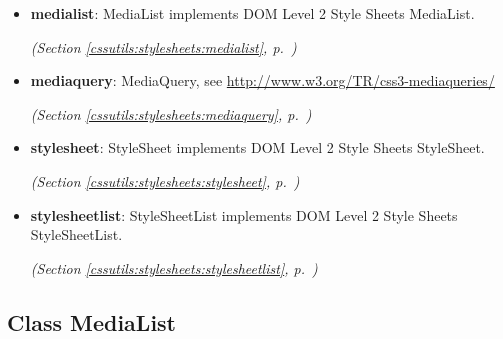 \begin{itemize}
\setlength{\parskip}{0ex}
\item \textbf{medialist}: 
MediaList implements DOM Level 2 Style Sheets MediaList.


  \textit{(Section \ref{cssutils:stylesheets:medialist}, p.~\pageref{cssutils:stylesheets:medialist})}

\item \textbf{mediaquery}: 
MediaQuery, see \href{http://www.w3.org/TR/css3-mediaqueries/}{http://www.w3.org/TR/css3-mediaqueries/}


  \textit{(Section \ref{cssutils:stylesheets:mediaquery}, p.~\pageref{cssutils:stylesheets:mediaquery})}

\item \textbf{stylesheet}: 
StyleSheet implements DOM Level 2 Style Sheets StyleSheet.


  \textit{(Section \ref{cssutils:stylesheets:stylesheet}, p.~\pageref{cssutils:stylesheets:stylesheet})}

\item \textbf{stylesheetlist}: 
StyleSheetList implements DOM Level 2 Style Sheets StyleSheetList.


  \textit{(Section \ref{cssutils:stylesheets:stylesheetlist}, p.~\pageref{cssutils:stylesheets:stylesheetlist})}

\end{itemize}



\subsection{Class MediaList}

